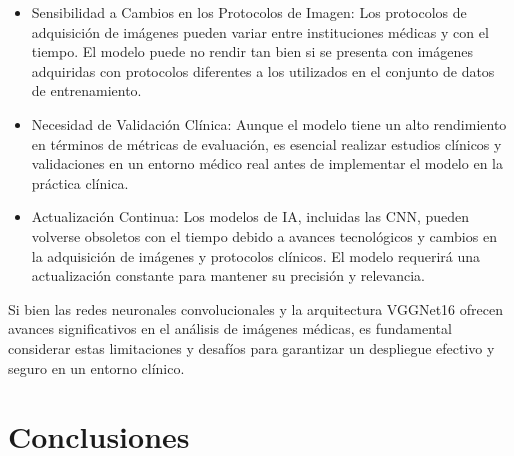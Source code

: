 \documentclass[12pt,twoside,titlepage]{ingenius}
\begin{document}
\begin{multicols}{2}
\begin{itemize}
	\item Sensibilidad a Cambios en los Protocolos de Imagen: Los protocolos de adquisición de imágenes pueden variar entre instituciones médicas y con el tiempo. El modelo puede no rendir tan bien si se presenta con imágenes adquiridas con protocolos diferentes a los utilizados en el conjunto de datos de entrenamiento.
	\item Necesidad de Validación Clínica: Aunque el modelo tiene un alto rendimiento en términos de métricas de evaluación, es esencial realizar estudios clínicos y validaciones en un entorno médico real antes de implementar el modelo en la práctica clínica.
	\item Actualización Continua: Los modelos de IA, incluidas las CNN, pueden volverse obsoletos con el tiempo debido a avances tecnológicos y cambios en la adquisición de imágenes y protocolos clínicos. El modelo requerirá una actualización constante para mantener su precisión y relevancia.
\end{itemize}

Si bien las redes neuronales convolucionales y la arquitectura VGGNet16 ofrecen avances significativos en el análisis de imágenes médicas, es fundamental considerar estas limitaciones y desafíos para garantizar un despliegue efectivo y seguro en un entorno clínico.


\section{Conclusiones}



\end{multicols}
\end{document}
